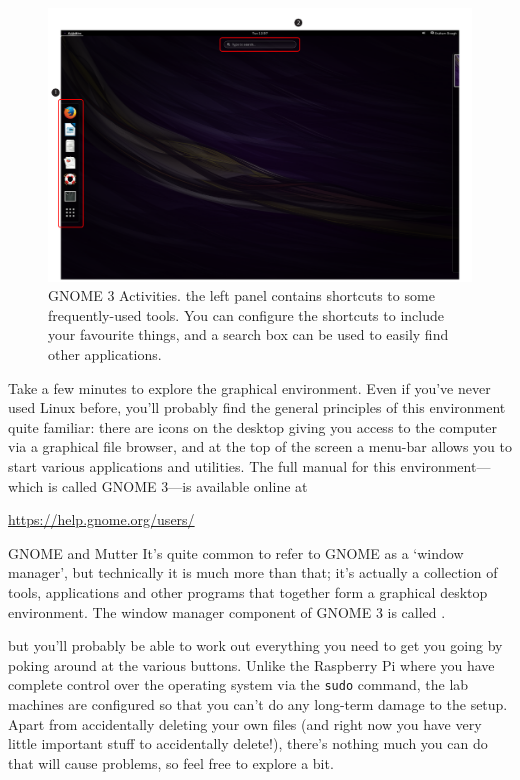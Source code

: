 \begin{figure}[t]
\centerline{\includegraphics[width=16cm]{images/gnome-activities-annotated}}
\caption{GNOME 3 Activities. \protect{} the left panel contains
  shortcuts to
  some frequently-used tools. You can  configure the shortcuts
  to include your favourite things, and \protect{} a search box can be used to easily find other applications.}\label{figure:gnome-activities}
\end{figure}

Take a few minutes to explore the graphical environment. Even if you've never used Linux before, you'll probably find the general principles of this environment quite familiar: there are icons on the desktop giving you access to the computer via a graphical file browser, and at the top of the screen a menu-bar allows you to start various applications and utilities. The full manual for this environment---which is called GNOME 3---is available online at

\noindent\url{https://help.gnome.org/users/}

\begin{linux}{GNOME and Mutter}
It's quite common to refer to GNOME as a `window manager', but technically it is much more than that; it's actually a collection of tools, applications and other programs that together form a graphical desktop environment. The window manager component of GNOME 3 is called .
\end{linux}

\noindent but you'll probably be able to work out everything you need to get you going by poking around at the various buttons. Unlike the Raspberry Pi where you have complete control over the operating system via the \texttt{sudo} command, the lab machines are configured so that you can't do any long-term damage to the setup. Apart from accidentally deleting your own files (and right now you have very little important stuff to accidentally delete!), there's nothing much you can do that will cause problems, so feel free to explore a bit.

